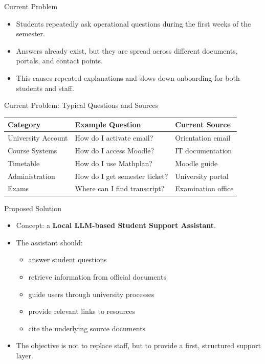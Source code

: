 \begin{frame}{Current Problem}
	\begin{itemize}
		\item Students repeatedly ask operational questions during the first weeks of the semester.
		\item Answers already exist, but they are spread across different documents, portals, and contact points.
		\item This causes repeated explanations and slows down onboarding for both students and staff.
	\end{itemize}
\end{frame}

\begin{frame}{Current Problem: Typical Questions and Sources}
	\scriptsize
	\begin{tabular}{p{2.4cm} p{4.8cm} p{3.0cm}}
		\textbf{Category} & \textbf{Example Question} & \textbf{Current Source} \\
		\hline
		University Account & How do I activate email? & Orientation email \\
		Course Systems & How do I access Moodle? & IT documentation \\
		Timetable & How do I use Mathplan? & Moodle guide \\
		Administration & How do I get semester ticket? & University portal \\
		Exams & Where can I find transcript? & Examination office \\
	\end{tabular}
\end{frame}


\begin{frame}{Proposed Solution}
	\begin{itemize}
		\item Concept: a \textbf{Local LLM-based Student Support Assistant}.
		\item The assistant should:
		\begin{itemize}
			\item answer student questions
			\item retrieve information from official documents
			\item guide users through university processes
			\item provide relevant links to resources
			\item cite the underlying source documents
		\end{itemize}
		\item The objective is not to replace staff, but to provide a first, structured support layer.
	\end{itemize}
\end{frame}

